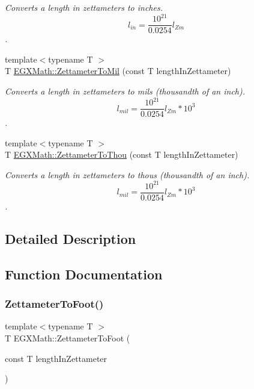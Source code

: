 \begin{DoxyCompactItemize}
\begin{DoxyCompactList}\small\item\em Converts a length in zettameters to inches. \[ l_{in}= \frac{10^{21}}{0.0254} l_{Zm} \]. \end{DoxyCompactList}\item 
{\footnotesize template$<$typename T $>$ }\\T \mbox{\hyperlink{group___e_g_x_math-_conversions-_length_conversions-_zettameter-_imperial_gad42b99391f53e56136f2411915c5e28d}{E\+G\+X\+Math\+::\+Zettameter\+To\+Mil}} (const T length\+In\+Zettameter)
\begin{DoxyCompactList}\small\item\em Converts a length in zettameters to mils (thousandth of an inch). \[ l_{mil}= \frac{10^{21}}{0.0254} l_{Zm} * 10^{3} \]. \end{DoxyCompactList}\item 
{\footnotesize template$<$typename T $>$ }\\T \mbox{\hyperlink{group___e_g_x_math-_conversions-_length_conversions-_zettameter-_imperial_gacd92ac6ab3300ca582966510e369a381}{E\+G\+X\+Math\+::\+Zettameter\+To\+Thou}} (const T length\+In\+Zettameter)
\begin{DoxyCompactList}\small\item\em Converts a length in zettameters to thous (thousandth of an inch). \[ l_{mil}= \frac{10^{21}}{0.0254} l_{Zm} * 10^{3} \]. \end{DoxyCompactList}\end{DoxyCompactItemize}


\subsection{Detailed Description}


\subsection{Function Documentation}
\mbox{\label{group___e_g_x_math-_conversions-_length_conversions-_zettameter-_imperial_ga2b64ad3efd85a1800a76661d05487a09}} 
\subsubsection{\texorpdfstring{Zettameter\+To\+Foot()}{ZettameterToFoot()}}
{\footnotesize\ttfamily template$<$typename T $>$ \\
T E\+G\+X\+Math\+::\+Zettameter\+To\+Foot (\begin{DoxyParamCaption}\item[{const T}]{length\+In\+Zettameter }\end{DoxyParamCaption})}



